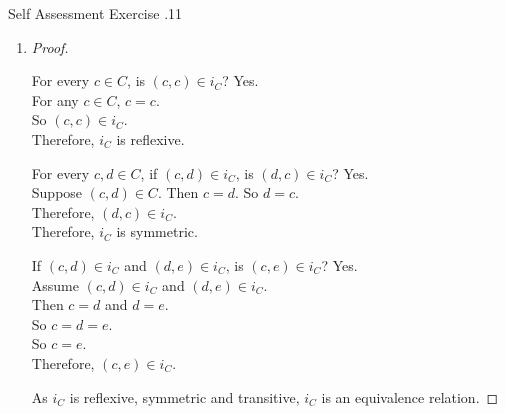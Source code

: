 \documentclass[../notes.tex]{subfiles}
\begin{document}
\begin{exercise}{Self Assessment Exercise \thechapter.11}
\begin{enumerate}
\begin{enumerate}
\begin{proof}
									As $i_{C}$ is both injective and surjective, $i_{C}$ is bijective.
								\end{proof}
							\item {}
								\begin{proof}
									\begin{subproof}[Reflexivity]
										For every $c \in C$, is $(c, c) \in i_{C}$? Yes.\\
										For any $c \in C$, $c = c$.\\
										So $(c, c) \in i_{C}$.\\
										Therefore, $i_{C}$ is reflexive.
									\end{subproof}
									\begin{subproof}[Symmetry]
										For every $c, d \in C$, if $(c, d) \in i_{C}$, is $(d, c) \in i_{C}$? Yes.\\
										Suppose $(c, d) \in C$. Then $c = d$. So $d = c$.\\
										Therefore, $(d, c) \in i_{C}$.\\
										Therefore, $i_{C}$ is symmetric.
									\end{subproof}
									\begin{subproof}[Transitivity]
										If $(c, d) \in i_{C}$ and $(d, e) \in i_{C}$, is $(c, e) \in i_{C}$? Yes.\\
										Assume $(c, d) \in i_{C}$ and $(d, e) \in i_{C}$.\\
										Then $c = d$ and $d = e$.\\
										So $c = d = e$.\\
										So $c = e$.\\
										Therefore, $(c, e) \in i_{C}$.
									\end{subproof}
									As $i_{C}$ is reflexive, symmetric and transitive, $i_{C}$ is an equivalence relation.
								\end{proof}
						\end{enumerate}
				\end{enumerate}
			\end{exercise}
\end{document}
